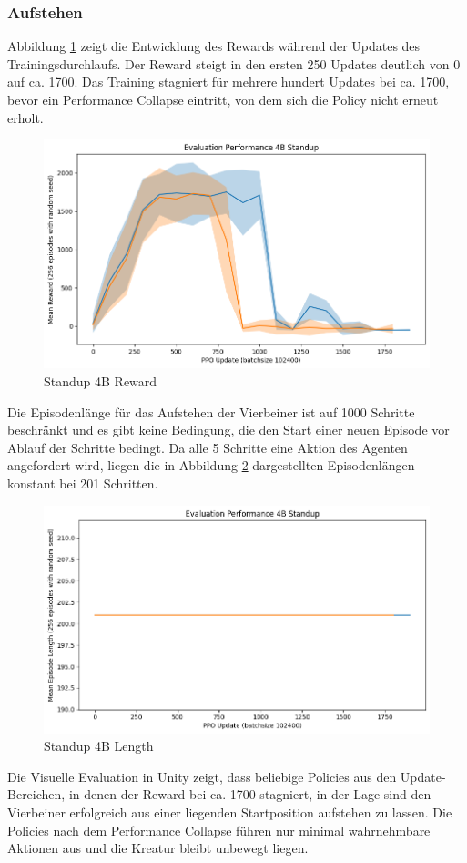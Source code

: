 \subsubsection{Aufstehen}
Abbildung \ref{fig:Standup4B_Reward} zeigt die Entwicklung des Rewards während der Updates des Trainingsdurchlaufs. Der Reward steigt in den ersten 250 Updates deutlich von 0 auf ca. 1700. Das Training stagniert für mehrere hundert Updates bei ca. 1700, bevor ein Performance Collapse eintritt, von dem sich die Policy nicht erneut erholt.

\begin{figure}[ht]
    \centering
    \includegraphics[width=0.5\linewidth]{resources/img/results/Standup4B_Reward.png}
    \caption{Standup 4B Reward}\label{fig:Standup4B_Reward}
\end{figure}

Die Episodenlänge für das Aufstehen der Vierbeiner ist auf 1000 Schritte beschränkt und es gibt keine Bedingung, die den Start einer neuen Episode vor Ablauf der Schritte bedingt. Da alle 5 Schritte eine Aktion des Agenten angefordert wird, liegen die in Abbildung \ref{fig:Standup4B_Length} dargestellten Episodenlängen konstant bei 201 Schritten.

\begin{figure}[ht]
    \centering
    \includegraphics[width=0.5\linewidth]{resources/img/results/Standup4B_Length.png}
    \caption{Standup 4B Length}\label{fig:Standup4B_Length}
\end{figure}

Die Visuelle Evaluation in Unity zeigt, dass beliebige Policies aus den Update-Bereichen, in denen der Reward bei ca. 1700 stagniert, in der Lage sind den Vierbeiner erfolgreich aus einer liegenden Startposition aufstehen zu lassen. Die Policies nach dem Performance Collapse führen nur minimal wahrnehmbare Aktionen aus und die Kreatur bleibt unbewegt liegen. 

